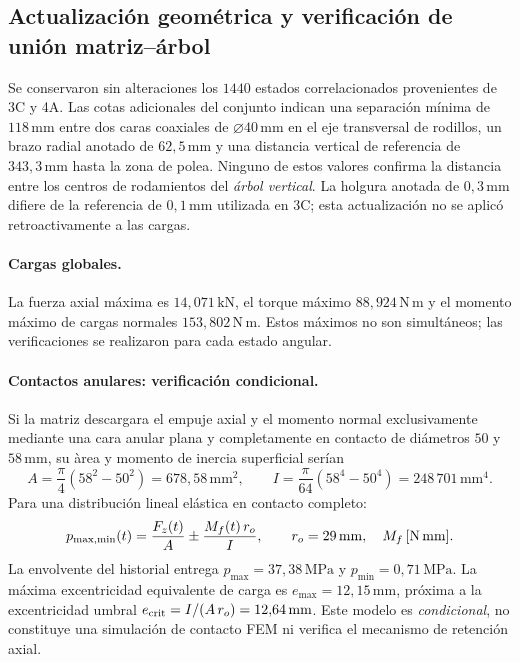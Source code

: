 \subsection{Actualizaci\'on geom\'etrica y verificaci\'on de uni\'on matriz--\'arbol}
Se conservaron sin alteraciones los $1440$ estados correlacionados provenientes de 3C y 4A. Las cotas adicionales del conjunto indican una separaci\'on m\'inima de $118\,\mathrm{mm}$ entre dos caras coaxiales de $\varnothing40\,\mathrm{mm}$ en el eje transversal de rodillos, un brazo radial anotado de $62{,}5\,\mathrm{mm}$ y una distancia vertical de referencia de $343{,}3\,\mathrm{mm}$ hasta la zona de polea. Ninguno de estos valores confirma la distancia entre los centros de rodamientos del \emph{\'arbol vertical}. La holgura anotada de $0{,}3\,\mathrm{mm}$ difiere de la referencia de $0{,}1\,\mathrm{mm}$ utilizada en 3C; esta actualizaci\'on no se aplic\'o retroactivamente a las cargas.

\paragraph{Cargas globales.}
La fuerza axial m\'axima es $14{,}071\,\mathrm{kN}$, el torque m\'aximo $88{,}924\,\mathrm{N\,m}$ y el momento m\'aximo de cargas normales $153{,}802\,\mathrm{N\,m}$. Estos m\'aximos no son simult\'aneos; las verificaciones se realizaron para cada estado angular.

\paragraph{Contactos anulares: verificaci\'on condicional.}
Si la matriz descargara el empuje axial y el momento normal exclusivamente mediante una cara anular plana y completamente en contacto de di\'ametros $50$ y $58\,\mathrm{mm}$, su \`area y momento de inercia superficial ser\'ian
\begin{equation}
A=\frac{\pi}{4}(58^2-50^2)=678{,}58\,\mathrm{mm^2},\qquad
I=\frac{\pi}{64}(58^4-50^4)=248\,701\,\mathrm{mm^4}.
\end{equation}
Para una distribuci\'on lineal el\'astica en contacto completo:
\begin{equation}
p_{\rm max,min}(t)=\frac{F_z(t)}{A}\pm\frac{M_f(t)\,r_o}{I},\qquad
r_o=29\,\mathrm{mm},\quad M_f\,[\mathrm{N\,mm}].
\end{equation}
La envolvente del historial entrega $p_{\max}=37{,}38\,\mathrm{MPa}$ y $p_{\min}=0{,}71\,\mathrm{MPa}$. La m\'axima excentricidad equivalente de carga es $e_{\max}=12{,}15\,\mathrm{mm}$, pr\'oxima a la excentricidad umbral $e_{\rm crit}=I/(A\,r_o)=12{,}64\,\mathrm{mm}$. Este modelo es \emph{condicional}, no constituye una simulaci\'on de contacto FEM ni verifica el mecanismo de retenci\'on axial.

